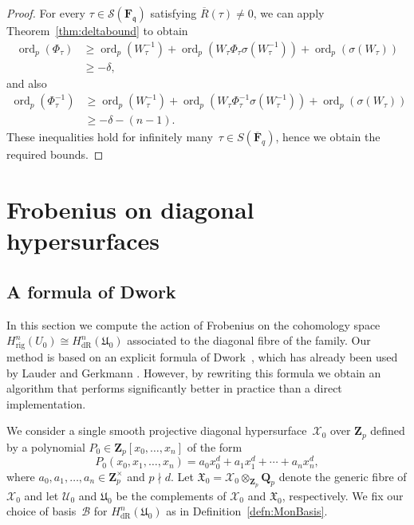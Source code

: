 \documentclass[a4paper,11pt]{article}
\numberwithin{equation}{section}
\newcommand{\ZZ}{\mathbf{Z}} %
\newcommand{\QQ}{\mathbf{Q}} %
\newcommand{\FF}{\mathbf{F}} %
\DeclareMathOperator{\ord}{ord}          %
\providecommand{\HdR}{H_{\text{dR}}}    %
\providecommand{\Hrig}{H_{\text{rig}}}  %
\providecommand{\cB}{\mathcal{B}} %
\theoremstyle{definition}
\begin{document}
\begin{proof}
For every $\tau \in \mathcal{S}(\FF_{\mathfrak{q}})$ satisfying 
$\overline{R}(\tau) \neq 0$, we can apply Theorem~\ref{thm:deltabound} 
to obtain
\begin{align*}
\ord_p(\Phi_{\tau}) &\geq \ord_p(W^{-1}_{\tau}) + \ord_p(W_{\tau} \Phi_{\tau} \sigma(W_{\tau}^{-1})) + \ord_p(\sigma(W_{\tau})) \\
&\geq -\delta,
\end{align*}
and also
\begin{align*}
\ord_p(\Phi^{-1}_{\tau}) &\geq \ord_p(W^{-1}_{\tau}) + \ord_p(W_{\tau} \Phi^{-1}_{\tau} \sigma(W_{\tau}^{-1})) + \ord_p(\sigma(W_{\tau})) \\
&\geq -\delta - (n-1).
\end{align*}
These inequalities hold for infinitely many~$\tau \in S(\overline{\FF}_q)$, hence we obtain the required bounds.
\end{proof}


\section{Frobenius on diagonal hypersurfaces}
\label{sec:Diagonal}

\subsection{A formula of Dwork}

In this section we compute the action of Frobenius on the cohomology 
space $\Hrig^{n}(U_0) \cong \HdR^{n}(\mathfrak{U}_0)$ associated 
to the diagonal fibre of the family. Our method is based on an 
explicit formula of Dwork~\citep[\S 4]{Dwork1964}, which has already 
been used by Lauder \cite{Lauder2004b} and Gerkmann 
\cite{Gerkmann2007}. However, by rewriting this formula we obtain an 
algorithm that performs significantly better in practice than a direct 
implementation.

We consider a single smooth 
projective diagonal hypersurface~$\mathcal{X}_0$ over $\ZZ_p$ defined by 
a polynomial $P_0 \in \ZZ_p[x_0, \dotsc, x_n]$ of the form
\begin{equation*}
P_0(x_0, x_1, \dotsc, x_n) = 
    a_0 x_0^d + a_1 x_1^d + \dotsb + a_n x_n^d,
\end{equation*}
where $a_0, a_1, \dotsc, a_n \in \ZZ_p^{\times}$ and $p \nmid d$. 
Let $\mathfrak{X}_0 = \mathcal{X}_0 \otimes_{\ZZ_p} \QQ_p$ denote the generic 
fibre of $\mathcal{X}_0$ and let $\mathcal{U}_0$ and $\mathfrak{U}_0$ be the complements
of $\mathcal{X}_0$ and $\mathfrak{X}_0$, respectively. 
We fix our choice of basis~$\cB$ for $\HdR^{n}(\mathfrak{U}_0)$ 
as in Definition~\ref{defn:MonBasis}. 
\end{document}
